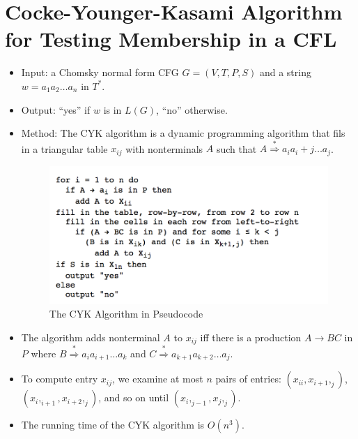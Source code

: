\documentclass[]{article}
\begin{document}
\section{Cocke-Younger-Kasami Algorithm for Testing Membership in a CFL}
  \begin{itemize}
    \item Input: a Chomsky normal form CFG $G = (V,T,P,S)$ and a string $w = 
    a_1a_2\ldots{a_n}$ in $T^*$.
    \item Output: ``yes'' if $w$ is in $L(G)$, ``no'' otherwise.
    \item Method: The CYK algorithm is a dynamic programming algorithm that fils 
    in a triangular table $x_{ij}$ with nonterminals $A$ such that $A \overset{*}
    {\Rightarrow} a_ia_i+j\ldots{a_j}$.
      \begin{figure}[p]
        \includegraphics{./img/CYK_Algorithm.png}
        \caption{The CYK Algorithm in Pseudocode}
      \end{figure}
    \item The algorithm adds nonterminal $A$ to $x_{ij}$ iff there is a production 
    $A \rightarrow BC$ in $P$ where $B \overset{*}{\Rightarrow}a_ia_{i
    +1}\ldots{a_k}$ and $C \overset{*}{\Rightarrow}a_{k+1}a_{k+2}\ldots{a_j}$.
    \item To compute entry $x_{ij}$, we examine at most $n$ pairs of entries: $
    (x_{ii},x_{i+1},_j)$,$(x_i,_{i+1},x_{i+2},_j)$, and so on until $
    (x_i,_{j-1},x_{j},_j)$.
    \item The running time of the CYK algorithm is $O(n^3)$.
  \end{itemize}
\end{document}
